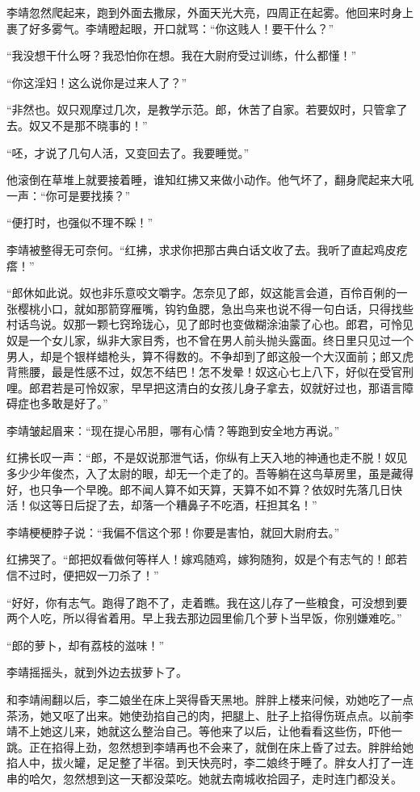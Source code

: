 李靖忽然爬起来，跑到外面去撒尿，外面天光大亮，四周正在起雾。他回来时身上裹了好多雾气。李靖瞪起眼，开口就骂：“你这贱人！要干什么？”

“我没想干什么呀？我恐怕你在想。我在大尉府受过训练，什么都懂！”

“你这淫妇！这么说你是过来人了？”

“非然也。奴只观摩过几次，是教学示范。郎，休苦了自家。若要奴时，只管拿了去。奴又不是那不晓事的！”

“呸，才说了几句人活，又变回去了。我要睡觉。”

他滚倒在草堆上就要接着睡，谁知红拂又来做小动作。他气坏了，翻身爬起来大吼一声：“你可是要找揍？”

“便打时，也强似不理不睬！”

李靖被整得无可奈何。“红拂，求求你把那古典白话文收了去。我听了直起鸡皮疙瘩！”

“郎休如此说。奴也非乐意咬文嚼字。怎奈见了郎，奴这能言会道，百伶百俐的一张樱桃小口，就如那箭穿雁嘴，钩钓鱼腮，急出鸟来也说不得一句白话，只得找些村话鸟说。奴那一颗七窍玲珑心，见了郎时也变做糊涂油蒙了心也。郎君，可怜见奴是一个女儿家，纵非大家目秀，也不曾在男人前头抛头露面。终日里只见过一个男人，却是个银样蜡枪头，算不得数的。不争却到了郎这般一个大汉面前；郎又虎背熊腰，最是性感不过，奴怎不结巴！怎不发晕！奴这心七上八下，好似在受官刑哩。郎君若是可怜奴家，早早把这清白的女孩儿身子拿去，奴就好过也，那语言障碍症也多敢是好了。”

李靖皱起眉来：“现在提心吊胆，哪有心情？等跑到安全地方再说。”

红拂长叹一声：“郎，不是奴说那泄气话，你纵有上天入地的神通也走不脱！奴见多少少年俊杰，入了太尉的眼，却无一个走了的。吾等躺在这鸟草房里，虽是藏得好，也只争一个早晚。郎不闻人算不如天算，天算不如不算？依奴时先落几日快活！似这等日后捉了去，却落一个糟鼻子不吃酒，枉担其名！”

李靖梗梗脖子说：“我偏不信这个邪！你要是害怕，就回大尉府去。”

红拂哭了。“郎把奴看做何等样人！嫁鸡随鸡，嫁狗随狗，奴是个有志气的！郎若信不过时，便把奴一刀杀了！”

“好好，你有志气。跑得了跑不了，走着瞧。我在这儿存了一些粮食，可没想到要两个人吃，所以得省着用。早上我去那边园里偷几个萝卜当早饭，你别嫌难吃。”

“郎的萝卜，却有荔枝的滋味！”

李靖摇摇头，就到外边去拔萝卜了。

和李靖闹翻以后，李二娘坐在床上哭得昏天黑地。胖胖上楼来问候，劝她吃了一点茶汤，她又呕了出来。她使劲掐自己的肉，把腿上、肚子上掐得伤斑点点。以前李靖不上她这儿来，她就这么整治自己。等他来了以后，让他看看这些伤，吓他一跳。正在掐得上劲，忽然想到李靖再也不会来了，就倒在床上昏了过去。胖胖给她掐人中，拔火罐，足足整了半宿。到天快亮时，李二娘终于睡了。胖女人打了一连串的哈欠，忽然想到这一天都没菜吃。她就去南城收拾园子，走时连门都没关。

